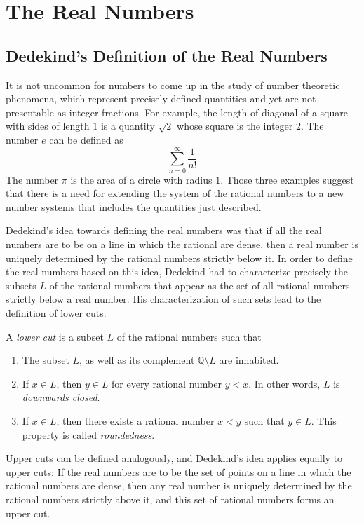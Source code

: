 \chapter{The Real Numbers}

\section{Dedekind's Definition of the Real Numbers}

It is not uncommon for numbers to come up in the study of number theoretic phenomena, which represent precisely defined quantities and yet are not presentable as integer fractions. For example, the length of diagonal of a square with sides of length $1$ is a quantity $\sqrt{2}$ whose square is the integer $2$. The number $e$ can be defined as
\begin{equation*}
  \sum_{n=0}^\infty \frac{1}{n!}
\end{equation*}
The number $\pi$ is the area of a circle with radius $1$. Those three examples suggest that there is a need for extending the system of the rational numbers to a new number systems that includes the quantities just described.

Dedekind's idea towards defining the real numbers was that if all the real numbers are to be on a line in which the rational are dense, then a real number is uniquely determined by the rational numbers strictly below it. In order to define the real numbers based on this idea, Dedekind had to characterize precisely the subsets $L$ of the rational numbers that appear as the set of all rational numbers strictly below a real number. His characterization of such sets lead to the definition of lower cuts.

\begin{definition}
  A \emph{lower cut} is a subset $L$ of the rational numbers such that
  \begin{enumerate}
  \item The subset $L$, as well as its complement $\mathbb{Q}\setminus L$ are inhabited.
  \item If $x\in L$, then $y\in L$ for every rational number $y<x$. In other words, $L$ is \emph{downwards closed}.
  \item If $x\in L$, then there exists a rational number $x<y$ such that $y\in L$. This property is called \emph{roundedness}.
  \end{enumerate}
\end{definition}

Upper cuts can be defined analogously, and Dedekind's idea applies equally to upper cuts: If the real numbers are to be the set of points on a line in which the rational numbers are dense, then any real number is uniquely determined by the rational numbers strictly above it, and this set of rational numbers forms an upper cut.

